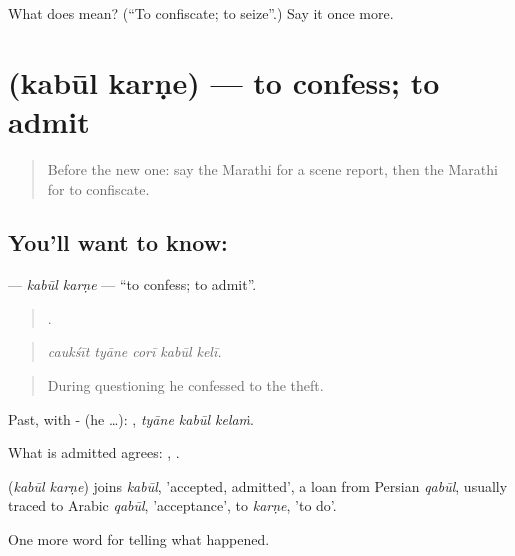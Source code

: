 \begin{tcolorbox}[breakable,colback=teal!4,colframe=teal!35!black,title={Before you move on}]
What does   mean? (\textquotedblleft{}To confiscate; to seize\textquotedblright{}.) Say it once more.
\end{tcolorbox}
\section[\texorpdfstring{\mr{कबूल} \mr{करणे} (kabūl karṇe)}{कबूल करणे (kabūl karṇe)}]{  (kabūl karṇe) — to confess; to admit}

\label{lesson:MR-C299-kabul-karne}



\begin{quote}
Before the new one: say the Marathi for a scene report, then the Marathi for to confiscate.
\end{quote}

\subsection*{You'll want to know:  }
\textbf{ } — \emph{kabūl karṇe} — \textquotedblleft{}to confess; to admit\textquotedblright{}.

\begin{quote}
    .
\end{quote}

\begin{quote}
\emph{caukśīt tyāne corī kabūl kelī.}
\end{quote}

\begin{quote}
During questioning he confessed to the theft.
\end{quote}

Past, with - (he …):   , \emph{tyāne kabūl kelaṁ}.

What is admitted agrees:   ,   .

\begin{cousinweb}
\textbf{ } (\emph{kabūl karṇe}) joins \emph{kabūl}, 'accepted, admitted', a loan from Persian \emph{qabūl}, usually traced to Arabic \emph{qabūl}, 'acceptance', to \emph{karṇe}, 'to do'.
\end{cousinweb}

\begin{grammarlens}[title={What you've built}]
One more word for telling what happened.
\end{grammarlens}

